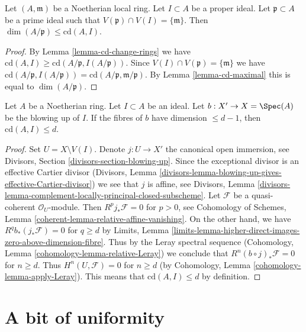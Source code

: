 \begin{lemma}
\label{lemma-cd-bound-dim-local}
Let $(A, \mathfrak m)$ be a Noetherian local ring.
Let $I \subset A$ be a proper ideal.
Let $\mathfrak p \subset A$ be a prime ideal
such that $V(\mathfrak p) \cap V(I) = \{\mathfrak m\}$.
Then $\dim(A/\mathfrak p) \leq \text{cd}(A, I)$.
\end{lemma}

\begin{proof}
By Lemma \ref{lemma-cd-change-rings} we have
$\text{cd}(A, I) \geq \text{cd}(A/\mathfrak p, I(A/\mathfrak p))$.
Since $V(I) \cap V(\mathfrak p) = \{\mathfrak m\}$ we have
$\text{cd}(A/\mathfrak p, I(A/\mathfrak p)) =
\text{cd}(A/\mathfrak p, \mathfrak m/\mathfrak p)$.
By Lemma \ref{lemma-cd-maximal} this is equal to $\dim(A/\mathfrak p)$.
\end{proof}

\begin{lemma}
\label{lemma-cd-blowup}
Let $A$ be a Noetherian ring. Let $I \subset A$ be an ideal.
Let $b : X' \to X = \Spec(A)$ be the blowing up of $I$.
If the fibres of $b$ have dimension $\leq d - 1$, then
$\text{cd}(A, I) \leq d$.
\end{lemma}

\begin{proof}
Set $U = X \setminus V(I)$. Denote $j : U \to X'$ the canonical open
immersion, see Divisors, Section \ref{divisors-section-blowing-up}.
Since the exceptional divisor is an effective Cartier divisor
(Divisors, Lemma
\ref{divisors-lemma-blowing-up-gives-effective-Cartier-divisor})
we see that $j$ is affine, see
Divisors, Lemma
\ref{divisors-lemma-complement-locally-principal-closed-subscheme}.
Let $\mathcal{F}$ be a quasi-coherent $\mathcal{O}_U$-module.
Then $R^pj_*\mathcal{F} = 0$ for $p > 0$, see
Cohomology of Schemes, Lemma
\ref{coherent-lemma-relative-affine-vanishing}.
On the other hand, we have $R^qb_*(j_*\mathcal{F}) = 0$ for
$q \geq d$ by Limits, Lemma
\ref{limits-lemma-higher-direct-images-zero-above-dimension-fibre}.
Thus by the Leray spectral sequence
(Cohomology, Lemma \ref{cohomology-lemma-relative-Leray})
we conclude that $R^n(b \circ j)_*\mathcal{F} = 0$ for
$n \geq d$. Thus $H^n(U, \mathcal{F}) = 0$ for $n \geq d$
(by Cohomology, Lemma \ref{cohomology-lemma-apply-Leray}).
This means that $\text{cd}(A, I) \leq d$ by definition.
\end{proof}





\section{A bit of uniformity}
\label{section-uniform-vanishing}

